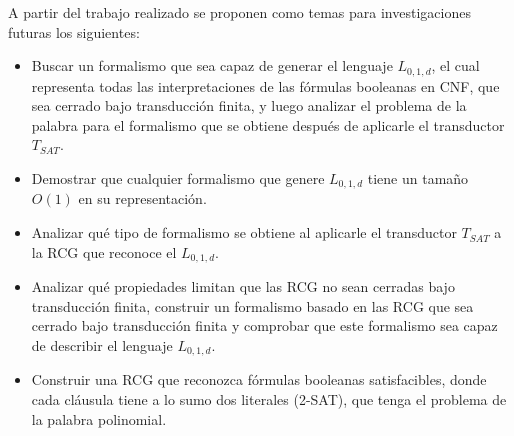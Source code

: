 \begin{recomendations}
      A partir del trabajo realizado se proponen como temas para investigaciones futuras los
      siguientes:
      
      \begin{itemize}
            \item Buscar un formalismo que sea capaz de generar el lenguaje $L_{0,1,d}$, el cual representa todas las interpretaciones
                  de las fórmulas booleanas en CNF, que sea cerrado bajo transducción finita, y luego analizar el problema de la palabra para
                  el formalismo que se obtiene después de aplicarle el transductor $T_{SAT}$.
            \item Demostrar que cualquier formalismo que genere $L_{0,1,d}$ tiene un tamaño $O(1)$ en su representación.
            \item Analizar qué tipo de formalismo se obtiene al aplicarle el transductor $T_{SAT}$ a la RCG que reconoce
                  el $L_{0,1,d}$.
            \item  Analizar qué propiedades limitan que las RCG no sean cerradas bajo transducción finita, construir
                  un formalismo basado en las RCG que sea cerrado bajo transducción finita y comprobar que este formalismo
                  sea capaz de describir el lenguaje $L_{0,1,d}$.
            \item Construir una RCG que reconozca fórmulas booleanas satisfacibles, donde cada cláusula tiene a lo sumo dos literales (2-SAT),
                  que tenga el problema de la palabra polinomial.
      \end{itemize}
      
\end{recomendations}
